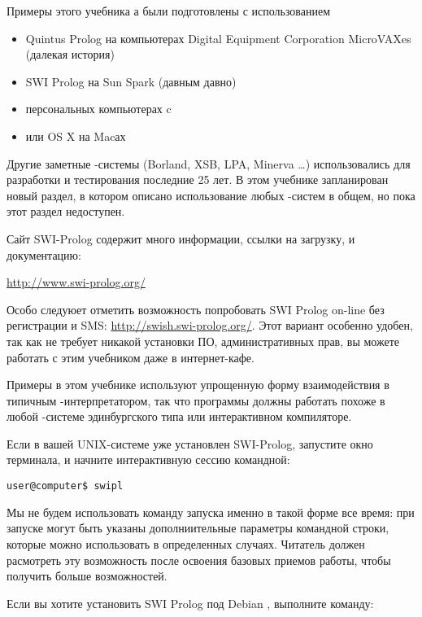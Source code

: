 \label{fish1}

Примеры этого учебника \prolog а были подготовлены с использованием

\begin{itemize}[nosep]
  \item Quintus Prolog на компьютерах Digital Equipment Corporation MicroVAXes
  (далекая история)
  \item SWI Prolog на Sun Spark (давным давно)
  \item персональных компьютерах c \win
  \item или OS X на Macах  
\end{itemize}
 
Другие заметные \prolog-системы (Borland, XSB, LPA, Minerva \ldots)
использовались для разработки и тестирования последние 25 лет.
В этом учебнике запланирован новый раздел, в котором описано использование
любых \prolog-систем в общем, но пока этот раздел недоступен.

Сайт SWI-Prolog содержит много информации, ссылки на загрузку, и документацию:

\url{http://www.swi-prolog.org/}

Особо следуюет отметить возможность попробовать SWI Prolog on-line без 
регистрации и SMS: \url{http://swish.swi-prolog.org/}. Этот вариант особенно
удобен, так как не требует никакой установки ПО, административных прав, вы
можете работать с этим учебником даже в интернет-кафе.

\bigskip
Примеры в этом учебнике используют упрощенную форму взаимодействия в типичным
\prolog-интерпретатором, так что программы должны работать похоже в любой
\prolog-системе эдинбургского типа или интерактивном компиляторе.

Если в вашей UNIX-системе уже установлен SWI-Prolog, запустите окно
терминала, и начните интерактивную сессию командной:

\begin{verbatim}
user@computer$ swipl
\end{verbatim}

Мы не будем использовать команду запуска именно в такой форме все время:
при запуске могут быть указаны дополниительные параметры командной строки,
которые можно использовать в определенных случаях. Читатель должен расмотреть
эту возможность после освоения базовых приемов работы, чтобы получить больше
возможностей.

Если вы хотите установить SWI Prolog под Debian \linux, выполните команду:

